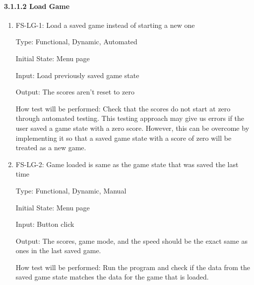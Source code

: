 \documentclass[12pt,letterpaper]{article}
\begin{document}
	\paragraph{3.1.1.2 Load Game}
	\begin{enumerate}
	\item FS-LG-1: Load a saved game instead of starting a new one

	Type: Functional, Dynamic, Automated

	Initial State: Menu page

	Input: Load previously saved game state

	Output: The scores aren’t reset to zero

	How test will be performed: Check that the scores do not start at zero through automated testing. This testing approach may give us errors if the user saved a game state with a zero score. However, this can be overcome by implementing it so that a saved game state with a score of zero will be treated as a new game.

	\item FS-LG-2: Game loaded is same as the game state that was saved the last time

	Type: Functional, Dynamic, Manual

	Initial State: Menu page

	Input: Button click

	Output: The scores, game mode, and the speed should be the exact same as ones in the last saved game.

	How test will be performed: Run the program and check if the data from the saved game state matches the data for the game that is loaded.
	\end{enumerate}
\end{document}
